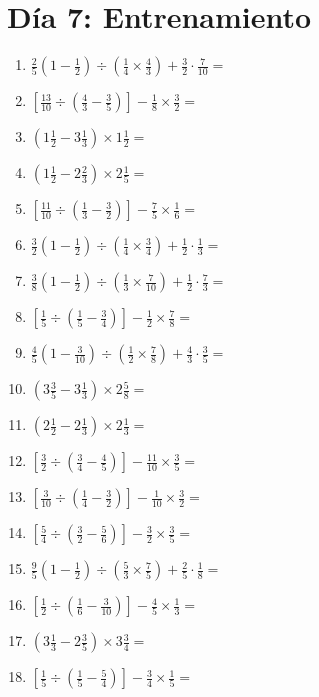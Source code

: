 \documentclass[12pt]{article}
\begin{document}
\section*{Día 7: Entrenamiento}
\begin{enumerate}[ itemsep=1.5cm]
	\item $\displaystyle \frac{2}{5} \left( 1 - \frac{1}{2} \right) \div \left( \frac{1}{4} \times \frac{4}{3} \right) + \frac{3}{2} \cdot \frac{7}{10} =$
	\item $\displaystyle \left[ \frac{13}{10} \div \left( \frac{4}{3} - \frac{3}{5} \right) \right] - \frac{1}{8} \times \frac{3}{2} =$
	\item $\displaystyle \left( 1 \frac{1}{2} - 3 \frac{1}{3} \right) \times 1 \frac{1}{2} =$
	\item $\displaystyle \left( 1 \frac{1}{2} - 2 \frac{2}{3} \right) \times 2 \frac{1}{5} =$
	\item $\displaystyle \left[ \frac{11}{10} \div \left( \frac{1}{3} - \frac{3}{2} \right) \right] - \frac{7}{5} \times \frac{1}{6} =$
	\item $\displaystyle \frac{3}{2} \left( 1 - \frac{1}{2} \right) \div \left( \frac{1}{4} \times \frac{3}{4} \right) + \frac{1}{2} \cdot \frac{1}{3} =$
	\item $\displaystyle \frac{3}{8} \left( 1 - \frac{1}{2} \right) \div \left( \frac{1}{3} \times \frac{7}{10} \right) + \frac{1}{2} \cdot \frac{7}{3} =$
	\item $\displaystyle \left[ \frac{1}{5} \div \left( \frac{1}{5} - \frac{3}{4} \right) \right] - \frac{1}{2} \times \frac{7}{8} =$
	\item $\displaystyle \frac{4}{5} \left( 1 - \frac{3}{10} \right) \div \left( \frac{1}{2} \times \frac{7}{8} \right) + \frac{4}{3} \cdot \frac{3}{5} =$

	\item $\displaystyle \left( 3 \frac{3}{5} - 3 \frac{1}{3} \right) \times 2 \frac{5}{8} =$
	\item $\displaystyle \left( 2 \frac{1}{2} - 2 \frac{1}{3} \right) \times 2 \frac{1}{3} =$
	\item $\displaystyle \left[ \frac{3}{2} \div \left( \frac{3}{4} - \frac{4}{5} \right) \right] - \frac{11}{10} \times \frac{3}{5} =$
	\item $\displaystyle \left[ \frac{3}{10} \div \left( \frac{1}{4} - \frac{3}{2} \right) \right] - \frac{1}{10} \times \frac{3}{2} =$
	\item $\displaystyle \left[ \frac{5}{4} \div \left( \frac{3}{2} - \frac{5}{6} \right) \right] - \frac{3}{2} \times \frac{3}{5} =$
	\item $\displaystyle \frac{9}{5} \left( 1 - \frac{1}{2} \right) \div \left( \frac{5}{3} \times \frac{7}{5} \right) + \frac{2}{5} \cdot \frac{1}{8} =$
	\item $\displaystyle \left[ \frac{1}{2} \div \left( \frac{1}{6} - \frac{3}{10} \right) \right] - \frac{4}{5} \times \frac{1}{3} =$
	\item $\displaystyle \left( 3 \frac{1}{3} - 2 \frac{3}{5} \right) \times 3 \frac{3}{4} =$
	\item $\displaystyle \left[ \frac{1}{5} \div \left( \frac{1}{5} - \frac{5}{4} \right) \right] - \frac{3}{4} \times \frac{1}{5} =$


\end{enumerate}
\end{document}
